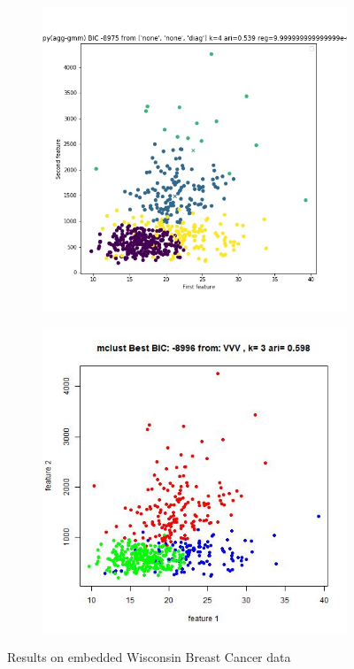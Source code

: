 \documentclass{article}
\begin{document}
\begin{figure}[h!]
\begin{subfigure}[b]{0.35\linewidth}
\caption{}
\end{subfigure} 
\begin{subfigure}[b]{0.35\linewidth}
  \includegraphics[width=\linewidth]{bc_python_bestbic.jpg}
\caption{}
\end{subfigure}
\begin{subfigure}[b]{0.35\linewidth}
  \includegraphics[width=\linewidth]{bc_r_bestbic.jpg}
\caption{}
\end{subfigure} 

\caption{Results on embedded Wisconsin Breast Cancer data}
\end{figure}
\end{document}
